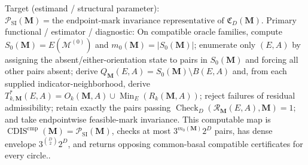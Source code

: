 \documentclass{article}
\begin{document}
Target (estimand / structural parameter): \(\mathcal P_{\mathrm{SI}}(\mathbf M)=\text{the endpoint-mark invariance representative of }\mathfrak C_D(\mathbf M)\).
Primary functional / estimator / diagnostic: On compatible oracle families, compute \(S_0(\mathbf M)=E(\mathcal M^{(0)})\) and \(m_0(\mathbf M)=|S_0(\mathbf M)|\); enumerate only \((E,A)\) by assigning the absent/either-orientation state to pairs in \(S_0(\mathbf M)\) and forcing all other pairs absent; derive \(Q_{\mathbf M}(E,A)=S_0(\mathbf M)\setminus B(E,A)\) and, from each supplied indicator-neighborhood, derive \(T^*_{k,\mathbf M}(E,A)=O_k(\mathbf M,A)\cup\operatorname{Min}_E(R_k(\mathbf M,A))\); reject failures of residual admissibility; retain exactly the pairs passing \(\operatorname{Check}_{D}(\mathcal R_{\mathbf M}(E,A),\mathbf M)=1\); and take endpointwise feasible-mark invariance.  This computable map is \(\operatorname{CDIS}^{\mathrm{cmp}}(\mathbf M)=\mathcal P_{\mathrm{SI}}(\mathbf M)\), checks at most \(3^{m_0(\mathbf M)}2^D\) pairs, has dense envelope \(3^{\binom D2}2^D\), and returns opposing common-basal compatible certificates for every circle..
\end{document}
